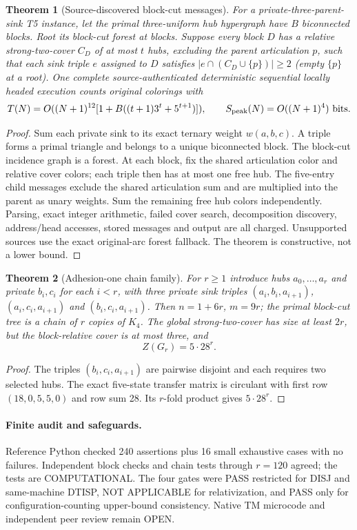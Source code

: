 \documentclass[11pt]{article}
\newtheorem{theorem}{Theorem}
\begin{document}
\begin{theorem}[Source-discovered block-cut messages]
For a private-three-parent-sink T5 instance, let the primal
three-uniform hub hypergraph have $B$ biconnected blocks.
Root its block-cut forest at blocks. Suppose every block $D$
has a relative strong-two-cover $C_D$ of at most $t$ hubs,
excluding the parent articulation $p$, such that each sink triple
$e$ assigned to $D$ satisfies
$|e\cap(C_D\cup\{p\})|\ge2$ (empty $\{p\}$ at a root).
One complete source-authenticated deterministic sequential
locally headed execution counts original colorings with
\[
T(N)=O((N+1)^{12}[1+B((t+1)3^t+5^{t+1})]),
\qquad S_{\rm peak}(N)=O((N+1)^4)\text{ bits}.
\]
\end{theorem}
\begin{proof}
Sum each private sink to its exact ternary weight $w(a,b,c)$.
A triple forms a primal triangle and belongs to a unique
biconnected block. The block-cut incidence graph is a forest.
At each block, fix the shared articulation color and relative
cover colors; each triple then has at most one free hub.
The five-entry child messages exclude the shared articulation
sum and are multiplied into the parent as unary weights. Sum
the remaining free hub colors independently. Parsing, exact
integer arithmetic, failed cover search, decomposition
discovery, address/head accesses, stored messages and output
are all charged. Unsupported sources use the exact original-arc
forest fallback. The theorem is constructive, not a lower bound.
\end{proof}

\begin{theorem}[Adhesion-one chain family]
For $r\ge1$ introduce hubs $a_0,\ldots,a_r$ and private
$b_i,c_i$ for each $i<r$, with three private sink triples
$(a_i,b_i,a_{i+1})$, $(a_i,c_i,a_{i+1})$ and
$(b_i,c_i,a_{i+1})$. Then $n=1+6r$, $m=9r$;
the primal block-cut tree is a chain of $r$ copies of $K_4$.
The global strong-two-cover has size at least $2r$, but
the block-relative cover is at most three, and
\[
Z(G_r)=5\cdot28^r.
\]
\end{theorem}
\begin{proof}
The triples $(b_i,c_i,a_{i+1})$ are pairwise disjoint and
each requires two selected hubs. The exact five-state transfer
matrix is circulant with first row $(18,0,5,5,0)$ and
row sum 28. Its $r$-fold product gives $5\cdot28^r$.
\end{proof}
\paragraph{Finite audit and safeguards.}
Reference Python checked 240 assertions plus 16 small exhaustive
cases with no failures. Independent block checks and chain
tests through $r=120$ agreed; the tests are COMPUTATIONAL.
The four gates were PASS restricted for DISJ and same-machine
DTISP, NOT APPLICABLE for relativization, and PASS only
for configuration-counting upper-bound consistency.
Native TM microcode and independent peer review remain OPEN.
\end{document}
